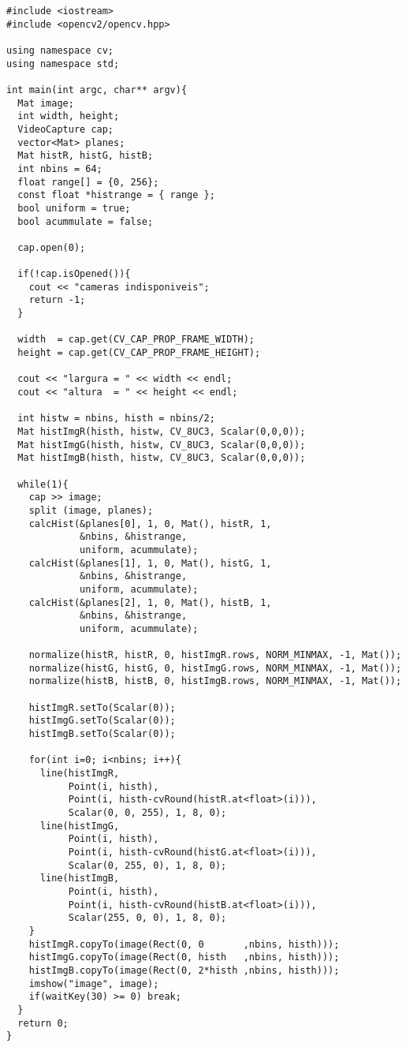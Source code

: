 \documentclass[11pt]{amsbook}
\begin{document}
\begin{verbatim}
#include <iostream>
#include <opencv2/opencv.hpp>

using namespace cv;
using namespace std;

int main(int argc, char** argv){
  Mat image;
  int width, height;
  VideoCapture cap;
  vector<Mat> planes;
  Mat histR, histG, histB;
  int nbins = 64;
  float range[] = {0, 256};
  const float *histrange = { range };
  bool uniform = true;
  bool acummulate = false;

  cap.open(0);

  if(!cap.isOpened()){
    cout << "cameras indisponiveis";
    return -1;
  }

  width  = cap.get(CV_CAP_PROP_FRAME_WIDTH);
  height = cap.get(CV_CAP_PROP_FRAME_HEIGHT);

  cout << "largura = " << width << endl;
  cout << "altura  = " << height << endl;

  int histw = nbins, histh = nbins/2;
  Mat histImgR(histh, histw, CV_8UC3, Scalar(0,0,0));
  Mat histImgG(histh, histw, CV_8UC3, Scalar(0,0,0));
  Mat histImgB(histh, histw, CV_8UC3, Scalar(0,0,0));

  while(1){
    cap >> image;
    split (image, planes);
    calcHist(&planes[0], 1, 0, Mat(), histR, 1,
             &nbins, &histrange,
             uniform, acummulate);
    calcHist(&planes[1], 1, 0, Mat(), histG, 1,
             &nbins, &histrange,
             uniform, acummulate);
    calcHist(&planes[2], 1, 0, Mat(), histB, 1,
             &nbins, &histrange,
             uniform, acummulate);

    normalize(histR, histR, 0, histImgR.rows, NORM_MINMAX, -1, Mat());
    normalize(histG, histG, 0, histImgG.rows, NORM_MINMAX, -1, Mat());
    normalize(histB, histB, 0, histImgB.rows, NORM_MINMAX, -1, Mat());

    histImgR.setTo(Scalar(0));
    histImgG.setTo(Scalar(0));
    histImgB.setTo(Scalar(0));

    for(int i=0; i<nbins; i++){
      line(histImgR,
           Point(i, histh),
           Point(i, histh-cvRound(histR.at<float>(i))),
           Scalar(0, 0, 255), 1, 8, 0);
      line(histImgG,
           Point(i, histh),
           Point(i, histh-cvRound(histG.at<float>(i))),
           Scalar(0, 255, 0), 1, 8, 0);
      line(histImgB,
           Point(i, histh),
           Point(i, histh-cvRound(histB.at<float>(i))),
           Scalar(255, 0, 0), 1, 8, 0);
    }
    histImgR.copyTo(image(Rect(0, 0       ,nbins, histh)));
    histImgG.copyTo(image(Rect(0, histh   ,nbins, histh)));
    histImgB.copyTo(image(Rect(0, 2*histh ,nbins, histh)));
    imshow("image", image);
    if(waitKey(30) >= 0) break;
  }
  return 0;
}
\end{verbatim}
\end{document}
